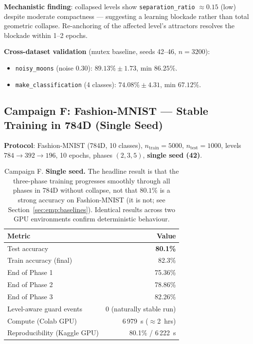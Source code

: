 \documentclass[11pt,a4paper]{article}
\begin{document}
\textbf{Mechanistic finding}: collapsed levels show \texttt{separation\_ratio} $\approx 0.15$
(low) despite moderate compactness --- suggesting a learning blockade rather than total
geometric collapse. Re-anchoring of the affected level's attractors resolves the blockade
within 1--2 epochs.

\textbf{Cross-dataset validation} (mutex baseline, seeds 42--46, $n=3200$):
\begin{itemize}
  \item \texttt{noisy\_moons} (noise 0.30): $89.13\% \pm 1.73$, min $86.25\%$.
  \item \texttt{make\_classification} (4 classes): $74.08\% \pm 4.31$, min $67.12\%$.
\end{itemize}

\subsection{Campaign F: Fashion-MNIST --- Stable Training in 784D (Single Seed)}
\label{sec:emp:fashion}

\textbf{Protocol}: Fashion-MNIST (784D, 10 classes), $n_{\mathrm{train}}=5000$,
$n_{\mathrm{test}}=1000$, levels $784 \to 392 \to 196$, 10 epochs, phases $(2,3,5)$,
\textbf{single seed (42)}.

\begin{table}[h]
\centering
\begin{tabular}{lr}
\toprule
\textbf{Metric} & \textbf{Value} \\
\midrule
Test accuracy                & \textbf{80.1\%} \\
Train accuracy (final)       & 82.3\% \\
End of Phase 1               & 75.36\% \\
End of Phase 2               & 78.86\% \\
End of Phase 3               & 82.26\% \\
Level-aware guard events     & 0 (naturally stable run) \\
Compute (Colab GPU)          & 6\,979~s ($\approx$2~hrs) \\
Reproducibility (Kaggle GPU) & 80.1\% / 6\,222~s \\
\bottomrule
\end{tabular}
\caption{Campaign F. \textbf{Single seed.} The headline result is that the
three-phase training progresses smoothly through all phases in 784D without collapse, not
that $80.1\%$ is a strong accuracy on Fashion-MNIST (it is not; see
Section~\ref{sec:emp:baselines}). Identical results across two GPU environments confirm
deterministic behaviour.}
\label{tab:campaign_f}
\end{table}
\end{document}
